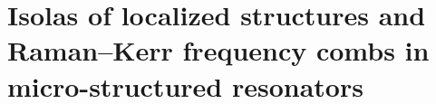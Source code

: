 \chapter{Isolas of localized structures and Raman–Kerr frequency combs in micro-structured resonators}
